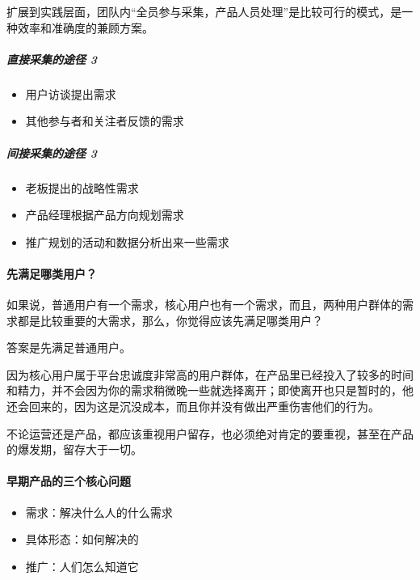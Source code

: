 \documentclass[letterpaper,11pt,english]{sphinxmanual}
\begin{document}
扩展到实践层面，团队内“全员参与采集，产品人员处理”是比较可行的模式，是一种效率和准确度的兼顾方案。


\subparagraph{直接采集的途径 3\sphinxfootnotemark[3]}
\label{\detokenize{chapter_introduction/need:id3}}%
\begin{footnotetext}[3]\sphinxAtStartFootnote
{}
%
\end{footnotetext}\ignorespaces \begin{itemize}
\item {} 
用户访谈提出需求

\item {} 
其他参与者和关注者反馈的需求

\end{itemize}


\subparagraph{间接采集的途径 3\sphinxfootnotemark[4]}
\label{\detokenize{chapter_introduction/need:id4}}%
\begin{footnotetext}[4]\sphinxAtStartFootnote
{}
%
\end{footnotetext}\ignorespaces \begin{itemize}
\item {} 
老板提出的战略性需求

\item {} 
产品经理根据产品方向规划需求

\item {} 
推广规划的活动和数据分析出来一些需求

\end{itemize}


\paragraph{先满足哪类用户？}
\label{\detokenize{chapter_introduction/need:id5}}
如果说，普通用户有一个需求，核心用户也有一个需求，而且，两种用户群体的需求都是比较重要的大需求，那么，你觉得应该先满足哪类用户？

答案是先满足普通用户。

因为核心用户属于平台忠诚度非常高的用户群体，在产品里已经投入了较多的时间和精力，并不会因为你的需求稍微晚一些就选择离开；即使离开也只是暂时的，他还会回来的，因为这是沉没成本，而且你并没有做出严重伤害他们的行为。

不论运营还是产品，都应该重视用户留存，也必须绝对肯定的要重视，甚至在产品的爆发期，留存大于一切。


\paragraph{早期产品的三个核心问题}
\label{\detokenize{chapter_introduction/need:id6}}\begin{itemize}
\item {} 
需求：解决什么人的什么需求

\item {} 
具体形态：如何解决的

\item {} 
推广：人们怎么知道它

\end{itemize}
\end{document}
